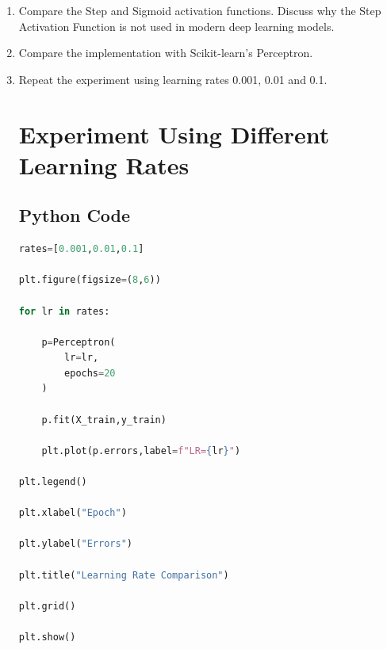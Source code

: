 \documentclass[11pt]{article}
\begin{document}
\begin{enumerate}[leftmargin=*]
\item Compare the Step and Sigmoid activation functions. Discuss why the Step Activation Function is not used in modern deep learning models.
\item Compare the implementation with Scikit-learn's Perceptron.
\item Repeat the experiment using learning rates 0.001, 0.01 and 0.1.

\section{Experiment Using Different Learning Rates}

\subsection{Python Code}
\begin{lstlisting}[language=Python]
rates=[0.001,0.01,0.1]

plt.figure(figsize=(8,6))

for lr in rates:

    p=Perceptron(
        lr=lr,
        epochs=20
    )

    p.fit(X_train,y_train)

    plt.plot(p.errors,label=f"LR={lr}")

plt.legend()

plt.xlabel("Epoch")

plt.ylabel("Errors")

plt.title("Learning Rate Comparison")

plt.grid()

plt.show()
\end{lstlisting}



\end{enumerate}
\end{document}
